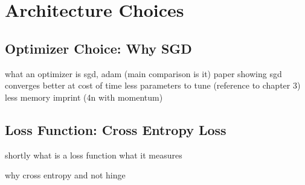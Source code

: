 \newpage
\section{Architecture Choices}

\subsection{Optimizer Choice: Why SGD}

what an optimizer is
sgd, adam (main comparison is it)
paper showing sgd converges better at cost of time
less parameters to tune (reference to chapter 3)
less memory imprint (4n with momentum)


\subsection{Loss Function: Cross Entropy Loss}

shortly what is a loss function
what it measures

why cross entropy and not hinge
